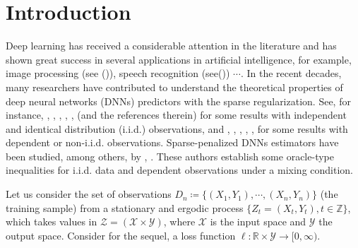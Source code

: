 \documentclass[10pt,twoside]{article}
\numberwithin{equation}{section}
\newcommand{\R}{\ensuremath{\mathbb{R}}}
\newcommand{\Z}{\ensuremath{\mathbb{Z}}}
\begin{document}
 
\section{Introduction}
%
Deep learning has received a considerable  attention in the literature and has shown great success in several applications  in  artificial intelligence, for example,  image processing (see (\cite{krizhevsky2017imagenet})),  speech recognition (see(\cite{hinton2012deep})) $\cdots$.
%
In  the recent decades, many researchers have contributed to understand  the theoretical properties of deep neural networks (DNNs) predictors with  the sparse regularization.
%
See, for instance, \cite{ohn2019smooth}, \cite{schmidt2019deep}, \cite{bauer2019deep}, \cite{schmidt2020nonparametric}, \cite{tsuji2021estimation}, \cite{kim2021fast} \cite{imaizumi2022advantage} (and the references therein) for some results with independent and identical distribution (i.i.d.) observations, and \cite{chen2019bbs}, \cite{kohler2020rate},  \cite{kurisu2022adaptive}, \cite{ma2022theoretical}, \cite{kengne2023deep}, \cite{kengne2023excess} for some results with dependent or non-i.i.d. observations. 
%
Sparse-penalized DNNs estimators have been studied, among others, by \cite{ohn2022nonconvex}, \cite{kurisu2022adaptive}.
%
These authors establish some oracle-type inequalities for i.i.d. data and dependent observations under a mixing condition.
 

\medskip

Let us  consider the set of observations $ D_n \coloneqq  \{ (X_1, Y_1), \cdots, (X_n, Y_n) \} $ (the training sample) from a stationary and ergodic process $\{Z_t =(X_t, Y_t), t \in \Z \} $, which takes values in $\mathcal{Z}=(\mathcal{X}  \times \mathcal{Y}) $,  where $\mathcal{X}$ is the input space and $\mathcal{Y}$ the output space.
Consider for the sequel, a loss function  $\ell: \R \times  \mathcal{Y} \rightarrow [0,\infty) $.

\medskip
\end{document}
